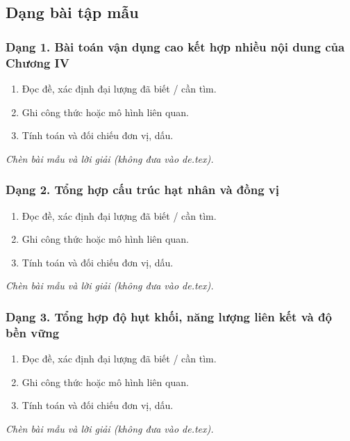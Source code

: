 

\subsection{Dạng bài tập mẫu}
\subsubsection{Dạng 1. Bài toán vận dụng cao kết hợp nhiều nội dung của Chương IV}
\begin{phuongphap}
\begin{enumerate}
\item Đọc đề, xác định đại lượng đã biết / cần tìm.
\item Ghi công thức hoặc mô hình liên quan.
\item Tính toán và đối chiếu đơn vị, dấu.
\end{enumerate}
\end{phuongphap}
\begin{vidumau}
\textit{Chèn bài mẫu và lời giải (không đưa vào de.tex).}
\end{vidumau}

\subsubsection{Dạng 2. Tổng hợp cấu trúc hạt nhân và đồng vị}
\begin{phuongphap}
\begin{enumerate}
\item Đọc đề, xác định đại lượng đã biết / cần tìm.
\item Ghi công thức hoặc mô hình liên quan.
\item Tính toán và đối chiếu đơn vị, dấu.
\end{enumerate}
\end{phuongphap}
\begin{vidumau}
\textit{Chèn bài mẫu và lời giải (không đưa vào de.tex).}
\end{vidumau}

\subsubsection{Dạng 3. Tổng hợp độ hụt khối, năng lượng liên kết và độ bền vững}
\begin{phuongphap}
\begin{enumerate}
\item Đọc đề, xác định đại lượng đã biết / cần tìm.
\item Ghi công thức hoặc mô hình liên quan.
\item Tính toán và đối chiếu đơn vị, dấu.
\end{enumerate}
\end{phuongphap}
\begin{vidumau}
\textit{Chèn bài mẫu và lời giải (không đưa vào de.tex).}
\end{vidumau}

